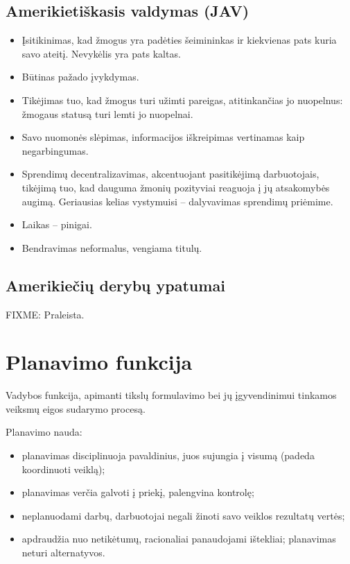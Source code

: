 \section{Amerikietiškasis valdymas (JAV)}

\begin{itemize}
  \item Įsitikinimas, kad žmogus yra padėties šeimininkas ir kiekvienas
    pats kuria savo ateitį. Nevykėlis yra pats kaltas.
  \item Būtinas pažado įvykdymas.
  \item Tikėjimas tuo, kad žmogus turi užimti pareigas, atitinkančias
    jo nuopelnus: žmogaus statusą turi lemti jo nuopelnai.
  \item Savo nuomonės slėpimas, informacijos iškreipimas vertinamas
    kaip negarbingumas.
  \item Sprendimų decentralizavimas, akcentuojant pasitikėjimą
    darbuotojais, tikėjimą tuo, kad dauguma žmonių pozityviai reaguoja
    į jų atsakomybės augimą. Geriausias kelias vystymuisi – dalyvavimas
    sprendimų priėmime.
  \item Laikas – pinigai.
  \item Bendravimas neformalus, vengiama titulų.
\end{itemize}

\section{Amerikiečių derybų ypatumai}

FIXME: Praleista.

\chapter{Planavimo funkcija}

\begin{defn}[Planavimas]
  Vadybos funkcija, apimanti tikslų formulavimo bei jų įgyvendinimui
  tinkamos veiksmų eigos sudarymo procesą.
\end{defn}

Planavimo nauda:
\begin{itemize}
  \item planavimas disciplinuoja pavaldinius, juos sujungia į visumą
    (padeda koordinuoti veiklą);
  \item planavimas verčia galvoti į priekį, palengvina kontrolę;
  \item neplanuodami darbų, darbuotojai negali žinoti savo veiklos
    rezultatų vertės;
  \item apdraudžia nuo netikėtumų, racionaliai panaudojami ištekliai;
    planavimas neturi alternatyvos. %
\end{itemize}

